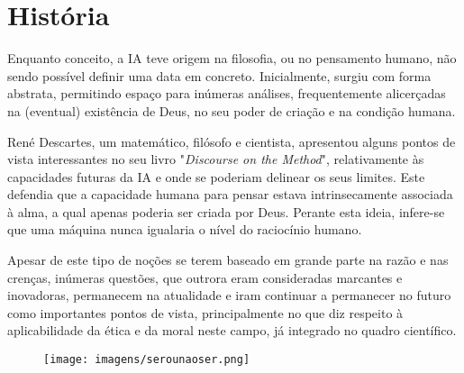 \documentclass{report}
\begin{document}






\chapter{História}
\label{chap.história}
Enquanto conceito, a \ac{IA} teve origem na filosofia, ou no pensamento humano, não sendo possível definir uma data em concreto. Inicialmente, surgiu com forma abstrata, permitindo espaço para inúmeras análises, frequentemente alicerçadas na (eventual) existência de Deus, no seu poder de criação e na condição humana.

René Descartes, um matemático, filósofo e cientista, apresentou alguns pontos de vista interessantes no seu livro "\textit{Discourse on the Method}"\cite{DoM}, relativamente às capacidades futuras da \ac{IA} e onde se poderiam delinear os seus limites. Este defendia que a capacidade humana para pensar estava intrinsecamente associada à alma, a qual apenas poderia ser criada por Deus. Perante esta ideia, infere-se que uma máquina nunca igualaria o nível do raciocínio humano. 

Apesar de este tipo de noções se terem baseado em grande parte na razão e nas crenças, inúmeras questões, que outrora eram consideradas marcantes e inovadoras, permanecem na atualidade e iram continuar a permanecer no futuro como importantes pontos de vista, principalmente no que diz respeito à aplicabilidade da ética e da moral neste campo, já integrado no quadro científico.
\vspace{10pt}
\begin{figure}[ht]
    \centering
    \texttt{[image: imagens/serounaoser.png]}
    
\end{figure}
\end{document}
